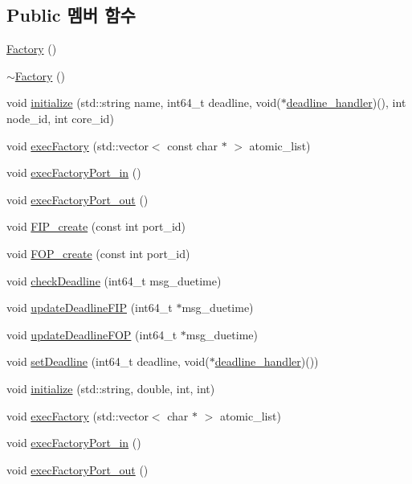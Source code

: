 \subsection*{Public 멤버 함수}
\begin{DoxyCompactItemize}
\item 
\hyperlink{classFactory_a213338063efff7dd723b05ef6b71fde3}{Factory} ()
\item 
\hyperlink{classFactory_aadae14f3339b510c3a82bcb7c77d7262}{$\sim$\+Factory} ()
\item 
void \hyperlink{classFactory_a64a97c299b156747868846be05ad9257}{initialize} (std\+::string name, int64\+\_\+t deadline, void($\ast$\hyperlink{sample__main_8cpp_ae298e0b16475a05fd3d021c2daf90062}{deadline\+\_\+handler})(), int node\+\_\+id, int core\+\_\+id)
\item 
void \hyperlink{classFactory_a500058128cac41fd5fd45aac1a8f3d7d}{exec\+Factory} (std\+::vector$<$ const char $\ast$ $>$ atomic\+\_\+list)
\item 
void \hyperlink{classFactory_a6ffc6624a41ccd66f6ba05b696e50211}{exec\+Factory\+Port\+\_\+in} ()
\item 
void \hyperlink{classFactory_a26be38da40eb21a04b0b4712282518e9}{exec\+Factory\+Port\+\_\+out} ()
\item 
void \hyperlink{classFactory_a83757b0ec4d4c3f1e6c1df0cbca2a5d9}{F\+I\+P\+\_\+create} (const int port\+\_\+id)
\item 
void \hyperlink{classFactory_a37a09c78d3bf8fb3df5ece85bace2733}{F\+O\+P\+\_\+create} (const int port\+\_\+id)
\item 
void \hyperlink{classFactory_a7f2a51ac39c034ccc0923eaa39cff780}{check\+Deadline} (int64\+\_\+t msg\+\_\+duetime)
\item 
void \hyperlink{classFactory_a5982eaac979b3ef080244ddc5007b690}{update\+Deadline\+F\+IP} (int64\+\_\+t $\ast$msg\+\_\+duetime)
\item 
void \hyperlink{classFactory_a0777c31e360f6c08f9069482501e3a70}{update\+Deadline\+F\+OP} (int64\+\_\+t $\ast$msg\+\_\+duetime)
\item 
void \hyperlink{classFactory_ab884eec61738ee5f0fcf7d25a4855bc0}{set\+Deadline} (int64\+\_\+t deadline, void($\ast$\hyperlink{sample__main_8cpp_ae298e0b16475a05fd3d021c2daf90062}{deadline\+\_\+handler})())
\item 
void \hyperlink{classFactory_af9ced939952de12016774d0225c93520}{initialize} (std\+::string, double, int, int)
\item 
void \hyperlink{classFactory_aef23e931404b99e10ae4d9b8723e24a6}{exec\+Factory} (std\+::vector$<$ char $\ast$ $>$ atomic\+\_\+list)
\item 
void \hyperlink{classFactory_a6ffc6624a41ccd66f6ba05b696e50211}{exec\+Factory\+Port\+\_\+in} ()
\item 
void \hyperlink{classFactory_a26be38da40eb21a04b0b4712282518e9}{exec\+Factory\+Port\+\_\+out} ()
\end{DoxyCompactItemize}
